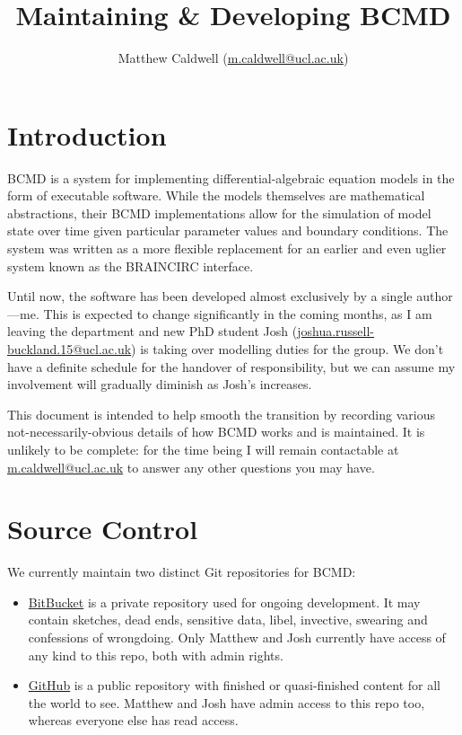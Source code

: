 \documentclass[a4paper,11pt]{article}
\title{Maintaining \& Developing BCMD}
\author{Matthew Caldwell (\href{mailto:m.caldwell@ucl.ac.uk}{m.caldwell@ucl.ac.uk})}
\begin{document}
\maketitle

\tableofcontents

\section{Introduction}\label{intro}

BCMD is a system for implementing differential-algebraic equation models in the form of executable software. While the models themselves are mathematical abstractions, their BCMD implementations allow for the simulation of model state over time given particular parameter values and boundary conditions. The system was written as a more flexible replacement for an earlier and even uglier system known as the BRAINCIRC interface.

Until now, the software has been developed almost exclusively by a single author---me. This is expected to change significantly in the coming months, as I am leaving the department and new PhD student Josh (\href{mailto:joshua.russell-buckland.15@ucl.ac.uk}{joshua.russell-buckland.15@ucl.ac.uk}) is taking over modelling duties for the group. We don't have a definite schedule for the handover of responsibility, but we can assume my involvement will gradually diminish as Josh's increases.

This document is intended to help smooth the transition by recording various not-necessarily-obvious details of how BCMD works and is maintained. It is unlikely to be complete: for the time being I will remain contactable at \href{mailto:m.caldwell@ucl.ac.uk}{m.caldwell@ucl.ac.uk} to answer any other questions you may have.


\section{Source Control}\label{git}

We currently maintain two distinct Git repositories for BCMD:
\begin{itemize}
\item \href{https://bitbucket.org/walkytalky/bcmd}{BitBucket} is a private repository used for ongoing development. It may contain sketches, dead ends, sensitive data, libel, invective, swearing and confessions of wrongdoing. Only Matthew and Josh currently have access of any kind to this repo, both with admin rights.
\item \href{https://github.com/bcmd}{GitHub} is a public repository with finished or quasi-finished content for all the world to see. Matthew and Josh have admin access to this repo too, whereas everyone else has read access.
\end{itemize}
\end{document}
